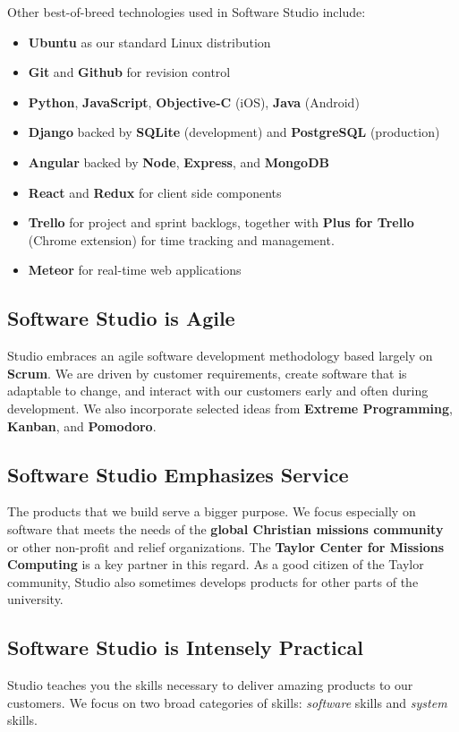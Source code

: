 \documentclass{article}
\begin{document}
Other best-of-breed technologies used in Software Studio include:
\begin{itemize}
\item \textbf{Ubuntu} as our standard Linux distribution
\item \textbf{Git} and \textbf{Github} for revision control
\item \textbf{Python}, \textbf{JavaScript}, \textbf{Objective-C} (iOS), \textbf{Java} (Android)
\item \textbf{Django} backed by \textbf{SQLite} (development) and \textbf{PostgreSQL} (production)
\item \textbf{Angular} backed by \textbf{Node}, \textbf{Express}, and \textbf{MongoDB}
\item \textbf{React} and \textbf{Redux} for client side components
\item \textbf{Trello} for project and sprint backlogs,
together with \textbf{Plus for Trello} (Chrome extension) for time tracking and management.
\item \textbf{Meteor} for real-time web applications
\end{itemize}
\subsection{Software Studio is Agile}
\label{sec:orgheadline5}
Studio embraces an agile software development methodology
based largely on \textbf{Scrum}.
We are driven by customer requirements,
create software that is adaptable to change,
and interact with our customers early and often during development.
We also incorporate selected ideas from \textbf{Extreme Programming},
\textbf{Kanban}, and \textbf{Pomodoro}.
\subsection{Software Studio Emphasizes Service}
\label{sec:orgheadline6}
The products that we build serve a bigger purpose.
We focus especially on software that meets the needs
of the \textbf{global Christian missions community}
or other non-profit and relief organizations.
The \textbf{Taylor Center for Missions Computing}
is a key partner in this regard.
As a good citizen of the Taylor community,
Studio also sometimes develops products for other parts of the university.
\subsection{Software Studio is Intensely Practical}
\label{sec:orgheadline7}
Studio teaches you the skills necessary
to deliver amazing products to our customers.
We focus on two broad categories of skills:
\emph{software} skills and \emph{system} skills.
\end{document}

